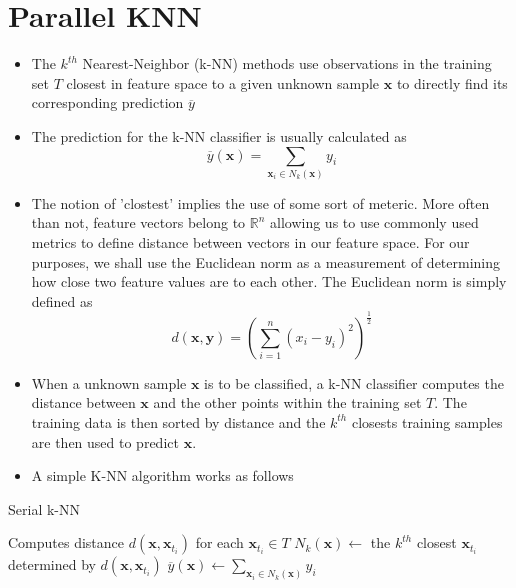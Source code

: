 \section{Parallel KNN}

\begin{itemize}
    \item The $k^{th}$ Nearest-Neighbor (k-NN) methods use observations in the training set $T$ closest in feature space to a given unknown sample $\bm{x}$ to directly find its corresponding prediction $\overline{y}$
    \item The prediction for the k-NN classifier is usually calculated as 
    \[
        \overline{y} \left( \bm{x} \right) = \sum_{\bm{x}_{i} \in N_{k} (\bm{x})} y_{i}
    \]
    \item The notion of 'clostest' implies the use of some sort of meteric. More often than not, feature vectors belong to $\mathbb{R}^{n}$ allowing us to use commonly used metrics to define distance between vectors in our feature space. For our purposes, we shall use the Euclidean norm as a measurement of determining how close two feature values are to each other. The Euclidean norm is simply defined as
    \[
        d \left( \bm{x}, \bm{y} \right) = \left( \sum_{i=1}^{n} \left( x_{i} - y_{i} \right)^{2} \right)^{\frac{1}{2}}
    \]
    \item When a unknown sample $\bm{x}$ is to be classified, a k-NN classifier computes the distance between $\bm{x}$ and the other points within the training set $T$. The training data is then sorted by distance and the $k^{th}$ closests training samples are then used to predict $\bm{x}$.
    \item A simple K-NN algorithm works as follows
\end{itemize}
\begin{algorithm}[ht!]
\caption{Serial k-NN}
\label{alg:serial-k-NN}
\footnotesize
\SetAlgoLined
    
    \BlankLine
    Computes distance $d \left( \bm{x}, \bm{x}_{t_i} \right)$ for each $\bm{x}_{t_i} \in T$\;
    $N_{k} (\bm{x}) \gets$ the $k^{th}$ closest $\bm{x}_{t_i}$ determined by $d \left( \bm{x}, \bm{x}_{t_i} \right)$\;
    $\overline{y} \left( \bm{x} \right) \gets \sum_{\bm{x}_{i} \in N_{k} (\bm{x})} y_{i}$\;
    \BlankLine
\end{algorithm}
